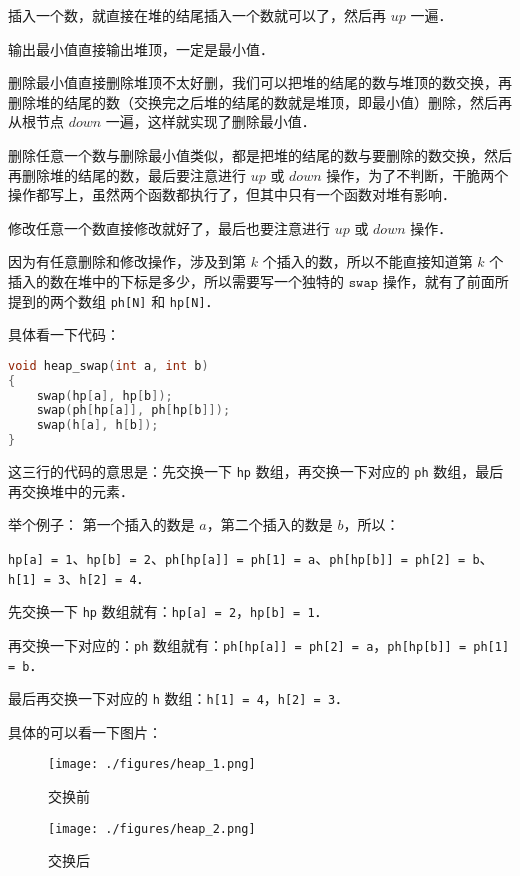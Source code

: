 插入一个数，就直接在堆的结尾插入一个数就可以了，然后再 $up$ 一遍．

输出最小值直接输出堆顶，一定是最小值．

删除最小值直接删除堆顶不太好删，我们可以把堆的结尾的数与堆顶的数交换，再删除堆的结尾的数（交换完之后堆的结尾的数就是堆顶，即最小值）删除，然后再从根节点 $down$ 一遍，这样就实现了删除最小值．

删除任意一个数与删除最小值类似，都是把堆的结尾的数与要删除的数交换，然后再删除堆的结尾的数，最后要注意进行 $up$ 或 $down$ 操作，为了不判断，干脆两个操作都写上，虽然两个函数都执行了，但其中只有一个函数对堆有影响．

修改任意一个数直接修改就好了，最后也要注意进行 $up$ 或 $down$ 操作．

因为有任意删除和修改操作，涉及到第 $k$ 个插入的数，所以不能直接知道第 $k$ 个插入的数在堆中的下标是多少，所以需要写一个独特的 $\mathtt{swap}$ 操作，就有了前面所提到的两个数组 \verb|ph[N]| 和 \verb|hp[N]|．

具体看一下代码：

\begin{lstlisting}[language=cpp]
void heap_swap(int a, int b)
{
    swap(hp[a], hp[b]);
    swap(ph[hp[a]], ph[hp[b]]);
    swap(h[a], h[b]);
}
\end{lstlisting}

这三行的代码的意思是：先交换一下 \verb|hp| 数组，再交换一下对应的 \verb|ph| 数组，最后再交换堆中的元素．

举个例子：
第一个插入的数是 $a$，第二个插入的数是 $b$，所以：

\verb|hp[a] = 1|、\verb|hp[b] = 2|、\verb|ph[hp[a]] = ph[1] = a|、\verb|ph[hp[b]] = ph[2] = b|、\verb|h[1] = 3|、\verb|h[2] = 4|．

先交换一下 \verb|hp| 数组就有：\verb|hp[a] = 2|，\verb|hp[b] = 1|．

再交换一下对应的：\verb|ph| 数组就有：\verb|ph[hp[a]] = ph[2] = a|，\verb|ph[hp[b]] = ph[1] = b|．

最后再交换一下对应的 \verb|h| 数组：\verb|h[1] = 4|，\verb|h[2] = 3|．

具体的可以看一下图片：
\begin{figure}[ht]
\centering
\texttt{[image: ./figures/heap\_1.png]}
\caption{交换前} \label{heap_fig1}
\end{figure}

\begin{figure}[ht]
\centering
\texttt{[image: ./figures/heap\_2.png]}
\caption{交换后} \label{heap_fig2}
\end{figure}

